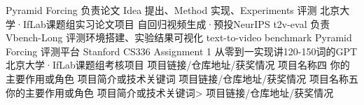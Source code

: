 \vspace{-3mm}
\begin{cventries}


  \cvproject
    {Pyramid Forcing} %
    {负责论文 Idea 提出、Method 实现、Experiments 评测} %
    {北京大学·IfLab课题组实习论文项目} %
    {自回归视频生成·预投NeurIPS} %
  \vspace{-5mm}
  \cvproject
    {t2v-eval} %
    {负责Vbench-Long 评测环境搭建、实验结果可视化} %
    {text-to-video  benchmark} %
    {Pyramid Forcing 评测平台} %
  \vspace{-5mm}
  \cvproject
    {Stanford CS336 Assignment 1} %
    {从零到一实现讲120-150词的GPT} %
    {北京大学·IfLab课题组考核项目} %
    {项目链接/仓库地址/获奖情况} %
  \vspace{-5mm}
  \cvproject
    {项目名称四} %
    {你的主要作用或角色} %
    {项目简介或技术关键词} %
    {项目链接/仓库地址/获奖情况} %
  \vspace{-5mm}
  \cvproject
    {项目名称五} %
    {你的主要作用或角色} %
    {项目简介或技术关键词>} %
    {项目链接/仓库地址/获奖情况} %

\end{cventries}

\vspace{-8mm}
